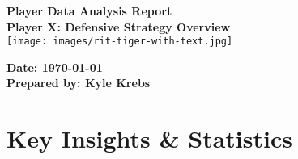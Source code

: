 \documentclass[a4paper,12pt]{article}
\begin{document}
\begin{titlepage}
    \centering
    {\Huge \textbf{Player Data Analysis Report}}\\[1.5cm]
    
    {\Large \textbf{Player X: Defensive Strategy Overview}}\\[2cm]
    
    \texttt{[image: images/rit-tiger-with-text.jpg]} %
    
    \vfill
    
    \textbf{Date: \today}\\[1cm]
    \textbf{Prepared by: Kyle Krebs}
\end{titlepage}

\section*{Key Insights \& Statistics}

\vspace{1em}
\end{document}
